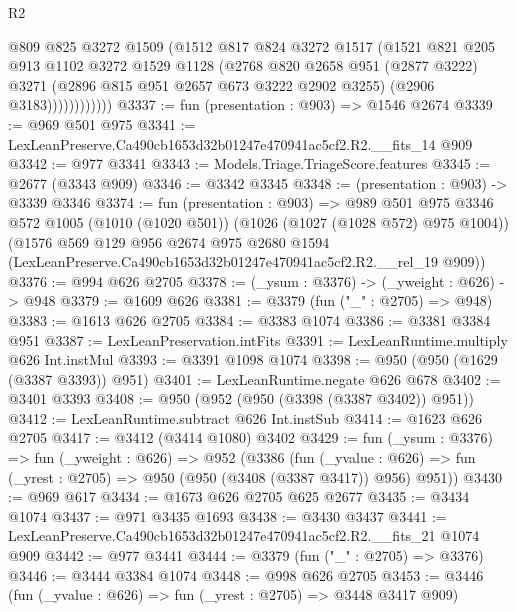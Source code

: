 \begin{lexlean}{R2}
\begin{coremodule}
                    @809
                    @825
                    @3272
                    @1509
                    (@1512
                      @817
                      @824
                      @3272
                      @1517
                      (@1521
                        @821
                        @205
                        @913
                        @1102
                        @3272
                        @1529
                        @1128
                        (@2768
                          @820
                          @2658
                          @951
                          (@2877 @3222)
                          @3271
                          (@2896 @815 @951 @2657 @673 @3222 @2902 @3255)
                          (@2906 @3183))))))))))))
@3337 := fun (presentation : @903) => @1546 @2674
@3339 := @969 @501 @975
@3341 := LexLeanPreserve.Ca490cb1653d32b01247e470941ac5cf2.R2.__fits_14 @909
@3342 := @977 @3341
@3343 := Models.Triage.TriageScore.features
@3345 := @2677 (@3343 @909)
@3346 := @3342 @3345
@3348 := (presentation : @903) -> @3339 @3346
@3374 := fun (presentation : @903) =>
  @989
    @501
    @975
    @3346
    @572
    @1005
    (@1010 (@1020 @501))
    (@1026 (@1027 (@1028 @572) @975 @1004))
    (@1576
      @569
      @129
      @956
      @2674
      @975
      @2680
      @1594
      (LexLeanPreserve.Ca490cb1653d32b01247e470941ac5cf2.R2.__rel_19 @909))
@3376 := @994 @626 @2705
@3378 := (_ysum : @3376) -> (_yweight : @626) -> @948
@3379 := @1609 @626
@3381 := @3379 (fun ("_" : @2705) => @948)
@3383 := @1613 @626 @2705
@3384 := @3383 @1074
@3386 := @3381 @3384 @951
@3387 := LexLeanPreservation.intFits
@3391 := LexLeanRuntime.multiply @626 Int.instMul
@3393 := @3391 @1098 @1074
@3398 := @950 (@950 (@1629 (@3387 @3393)) @951)
@3401 := LexLeanRuntime.negate @626 @678
@3402 := @3401 @3393
@3408 := @950 (@952 (@950 (@3398 (@3387 @3402)) @951))
@3412 := LexLeanRuntime.subtract @626 Int.instSub
@3414 := @1623 @626 @2705
@3417 := @3412 (@3414 @1080) @3402
@3429 := fun (_ysum : @3376) =>
  fun (_yweight : @626) =>
  @952
    (@3386
      (fun (_yvalue : @626) => fun (_yrest : @2705) => @950 (@950 (@3408 (@3387 @3417)) @956) @951))
@3430 := @969 @617
@3434 := @1673 @626 @2705 @625 @2677
@3435 := @3434 @1074
@3437 := @971 @3435 @1693
@3438 := @3430 @3437
@3441 := LexLeanPreserve.Ca490cb1653d32b01247e470941ac5cf2.R2.__fits_21 @1074 @909
@3442 := @977 @3441
@3444 := @3379 (fun ("_" : @2705) => @3376)
@3446 := @3444 @3384 @1074
@3448 := @998 @626 @2705
@3453 := @3446 (fun (_yvalue : @626) => fun (_yrest : @2705) => @3448 @3417 @909)

\end{coremodule}
\end{lexlean}
